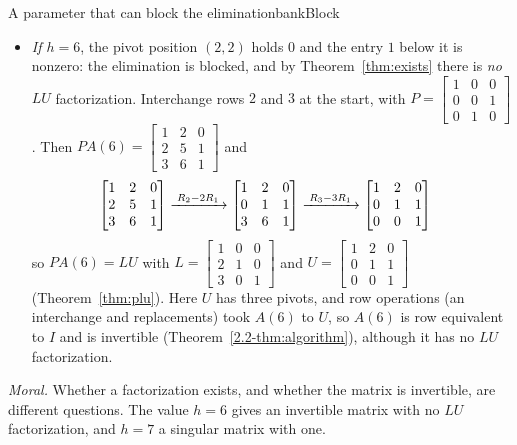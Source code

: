 \documentclass[11pt]{article}
\begin{document}
\begin{exmp}{A parameter that can block the elimination}{bankBlock}
\begin{itemize}
\begin{align*}
\end{align*}
  Check: row~$3$ of $LU$ is $2(1,2,0)+1(0,1,1)+1(0,0,0)=(2,5,1)$, the last row of $A(7)$. This matrix has an $LU$ factorization although it is not invertible: $A(7)(2,-1,1)=(2-2,\ 6-7+1,\ 4-5+1)=\bv{0}$.
  \item \emph{If $h=6$}, the pivot position $(2,2)$ holds $0$ and the entry $1$ below it is nonzero: the elimination is blocked, and by Theorem~\ref{thm:exists} there is \emph{no} $LU$ factorization. Interchange rows $2$ and $3$ at the start, with $P=\begin{bmatrix}1&0&0\\0&0&1\\0&1&0\end{bmatrix}$. Then $PA(6)=\begin{bmatrix}1&2&0\\2&5&1\\3&6&1\end{bmatrix}$ and
\begin{align*}
&\begin{bmatrix}1&2&0\\2&5&1\\3&6&1\end{bmatrix}
\xrightarrow{\;R_2-2R_1\;}
\begin{bmatrix}1&2&0\\0&1&1\\3&6&1\end{bmatrix}
\xrightarrow{\;R_3-3R_1\;}
\begin{bmatrix}1&2&0\\0&1&1\\0&0&1\end{bmatrix}
\end{align*}
  so $PA(6)=LU$ with $L=\begin{bmatrix}1&0&0\\2&1&0\\3&0&1\end{bmatrix}$ and $U=\begin{bmatrix}1&2&0\\0&1&1\\0&0&1\end{bmatrix}$ (Theorem~\ref{thm:plu}). Here $U$ has three pivots, and row operations (an interchange and replacements) took $A(6)$ to $U$, so $A(6)$ is row equivalent to $I$ and is invertible (Theorem~\ref{2.2-thm:algorithm}), although it has no $LU$ factorization.
\end{itemize}

\emph{Moral.} Whether a factorization exists, and whether the matrix is invertible, are different questions. The value $h=6$ gives an invertible matrix with no $LU$ factorization, and $h=7$ a singular matrix with one.
\end{exmp}
\end{document}
